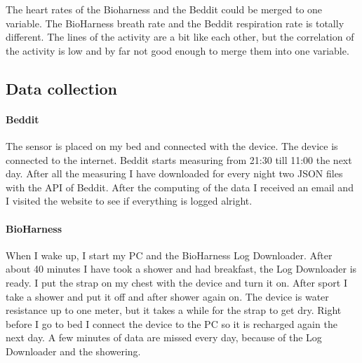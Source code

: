 			The heart rates of the Bioharness and the Beddit could be merged to one variable. The BioHarness breath rate and the Beddit respiration rate is totally different. The lines of the activity are a bit like each other, but the correlation of the activity is low and by far not good enough to merge them into one variable.

	\subsection{Data collection}
		\label{sec:datacollection}
		\paragraph{Beddit}
			The sensor is placed on my bed and connected with the device. The device is connected to the internet. Beddit starts measuring from 21:30 till 11:00 the next day. After all the measuring I have downloaded for every night two JSON files with the API of Beddit\cite{bedditapi}. After the computing of the data I received an email and I visited the website to see if everything is logged alright.
		\paragraph{BioHarness}
			When I wake up, I start my PC and the BioHarness Log Downloader. After about 40 minutes I have took a shower and had breakfast, the Log Downloader is ready. I put the strap on my chest with the device and turn it on. After sport I take a shower and put it off and after shower again on. The device is water resistance up to one meter, but it takes a while for the strap to get dry. Right before I go to bed I connect the device to the PC so it is recharged again the next day. A few minutes of data are missed every day, because of the Log Downloader and the showering. 
